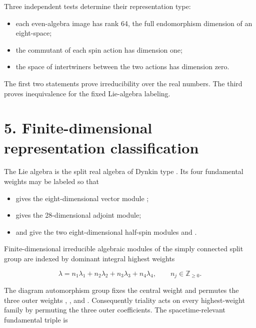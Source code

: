 \documentclass[11pt]{article}
\begin{document}
Three independent tests determine their representation type:

\begin{itemize}
\item each even-algebra image has rank 64, the full endomorphism dimension of an
eight-space;

\item the commutant of each spin action has dimension one;
\item the space of intertwiners between the two actions has dimension zero.
\end{itemize}

The first two statements prove irreducibility over the real numbers. The third proves inequivalence for the fixed Lie-algebra labeling.

\section{5. Finite-dimensional representation classification}

The Lie algebra \texttt{} is the split real algebra of Dynkin type \texttt{}. Its four fundamental weights may be labeled so that

\begin{itemize}
\item \texttt{} gives the eight-dimensional vector module \texttt{};
\item \texttt{} gives the 28-dimensional adjoint module;
\item \texttt{} and \texttt{} give the two eight-dimensional half-spin modules
\texttt{} and \texttt{}.

\end{itemize}

Finite-dimensional irreducible algebraic modules of the simply connected split group are indexed by dominant integral highest weights

\[
\lambda=n_1\lambda_1+n_2\lambda_2+n_3\lambda_3+n_4\lambda_4,
\qquad n_j\in\mathbb Z_{\ge0}.
\]

The diagram automorphism group fixes the central weight \texttt{} and permutes the three outer weights \texttt{}, \texttt{}, and \texttt{}. Consequently triality acts on every highest-weight family by permuting the three outer coefficients. The spacetime-relevant fundamental triple is
\end{document}
